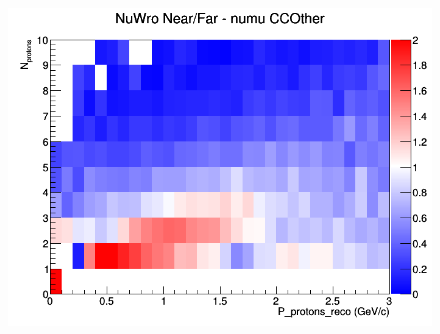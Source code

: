 \begin{figure}[h]
\endminipage
{}
\includegraphics[width=\linewidth]{eff_N_P/FGT/protons/ratios/CCOther_NuWro_numu_NF_N_P.png}
\endminipage
\newline
\end{figure}
\clearpage
